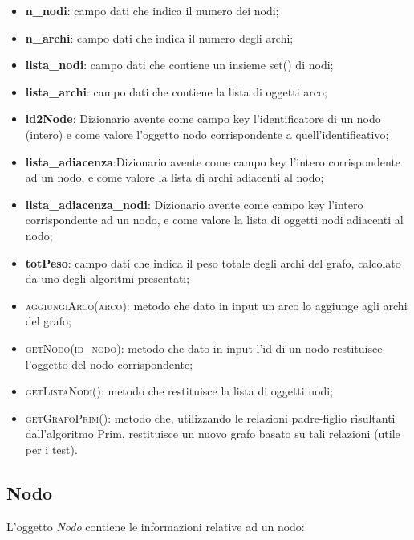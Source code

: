 \begin{itemize}
    \item \textbf{n\_nodi}: campo dati che indica il numero dei nodi;
    \item \textbf{n\_archi}: campo dati che indica il numero degli archi;
    \item \textbf{lista\_nodi}: campo dati che contiene un insieme set() di nodi; 
    \item \textbf{lista\_archi}: campo dati che contiene la lista di oggetti arco;
    \item \textbf{id2Node}: Dizionario avente come campo key l'identificatore di un nodo (intero) e come valore l'oggetto nodo corrispondente a quell'identificativo;
    \item \textbf{lista\_adiacenza}:Dizionario avente come campo key l'intero corrispondente ad un nodo,  e come valore la lista di archi adiacenti al nodo;
    \item \textbf{lista\_adiacenza\_nodi}: Dizionario avente come campo key l'intero corrispondente ad un nodo,  e come valore la lista di oggetti nodi adiacenti al nodo;
    \item \textbf{totPeso}: campo dati che indica il peso totale degli archi del grafo, calcolato da uno degli algoritmi presentati;
    \item \textsc{aggiungiArco(arco)}: metodo che dato in input un arco lo aggiunge agli archi del grafo;
    \item \textsc{getNodo(id\_nodo)}: metodo che dato in input l'id di un nodo restituisce l'oggetto del nodo corrispondente;
    \item \textsc{getListaNodi()}: metodo che restituisce la lista di  oggetti nodi;
    \item \textsc{getGrafoPrim()}: metodo che, utilizzando le relazioni padre-figlio risultanti dall'algoritmo Prim, restituisce un nuovo grafo basato su tali relazioni (utile per i test).
\end{itemize}

\subsection{Nodo}
\label{Nodo}

L'oggetto \textit{Nodo} contiene le informazioni relative ad un nodo:

